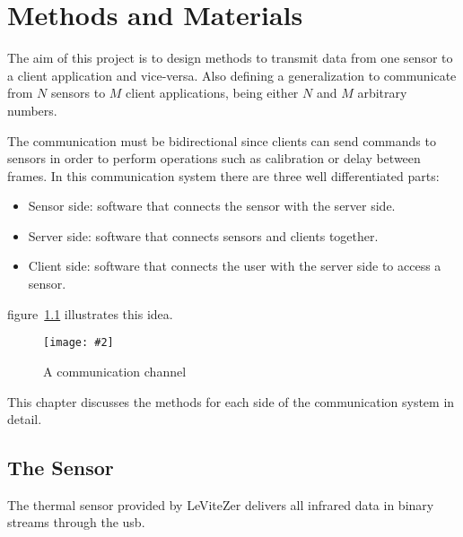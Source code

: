 \documentclass[hidelinks,11pt,a4paper,oneside,article]{memoir}
\newcommand{\putimage}[3][10] %
{
\begin{figure}[h]
	\centering
	\captionsetup{justification=centering}
	\texttt{[image: \#2]}
	\caption{#3}
	\label{fig:#2}
\end{figure}
}
\begin{document}
\clearpage\chapter{Methods and Materials}\label{sec:methods-and-materials}

The aim of this project is to design methods to transmit data from one sensor to a client application and vice-versa. Also defining a generalization to communicate from $N$ sensors to $M$ client applications, being either $N$ and $M$ arbitrary numbers.

The communication must be bidirectional since clients can send commands to sensors in order to perform operations such as calibration or delay between frames. In this communication system there are three well differentiated parts:
\begin{itemize}
    \item Sensor side: software that connects the sensor with the server side.
    \item Server side: software that connects sensors and clients together.
    \item Client side: software that connects the user with the server side to access a sensor.
\end{itemize}

figure~\ref{fig:communication-channel} illustrates this idea.

\putimage{communication-channel}{A communication channel}

This chapter discusses the methods for each side of the communication system in detail.


\section{The Sensor}
The thermal sensor provided by LeViteZer delivers all infrared data in binary streams through the \gls{usb}.
\end{document}
